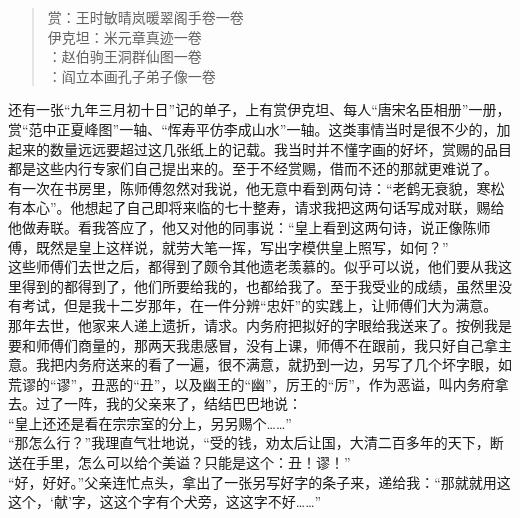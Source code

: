 \begin{quote}
	赏：王时敏晴岚暖翠阁手卷一卷\\

伊克坦：米元章真迹一卷\\

：赵伯驹王洞群仙图一卷\\

：阎立本画孔子弟子像一卷\\
\end{quote}

还有一张“九年三月初十日”记的单子，上有赏伊克坦、每人“唐宋名臣相册”一册，赏“范中正夏峰图”一轴、“恽寿平仿李成山水”一轴。这类事情当时是很不少的，加起来的数量远远要超过这几张纸上的记载。我当时并不懂字画的好坏，赏赐的品目都是这些内行专家们自己提出来的。至于不经赏赐，借而不还的那就更难说了。\\

有一次在书房里，陈师傅忽然对我说，他无意中看到两句诗：“老鹤无衰貌，寒松有本心”。他想起了自己即将来临的七十整寿，请求我把这两句话写成对联，赐给他做寿联。看我答应了，他又对他的同事说：“皇上看到这两句诗，说正像陈师傅，既然是皇上这样说，就劳大笔一挥，写出字模供皇上照写，如何？”\\

这些师傅们去世之后，都得到了颇令其他遗老羡慕的。似乎可以说，他们要从我这里得到的都得到了，他们所要给我的，也都给我了。至于我受业的成绩，虽然里没有考试，但是我十二岁那年，在一件分辨“忠奸”的实践上，让师傅们大为满意。\\

那年去世，他家来人递上遗折，请求。内务府把拟好的字眼给我送来了。按例我是要和师傅们商量的，那两天我患感冒，没有上课，师傅不在跟前，我只好自己拿主意。我把内务府送来的看了一遍，很不满意，就扔到一边，另写了几个坏字眼，如荒谬的“谬”，丑恶的“丑”，以及幽王的“幽”，厉王的“厉”，作为恶谥，叫内务府拿去。过了一阵，我的父亲来了，结结巴巴地说：\\

“皇上还还是看在宗宗室的分上，另另赐个……”\\

“那怎么行？”我理直气壮地说，“受的钱，劝太后让国，大清二百多年的天下，断送在手里，怎么可以给个美谥？只能是这个：丑！谬！”\\

“好，好好。”父亲连忙点头，拿出了一张另写好字的条子来，递给我：“那就就用这这个，‘献’字，这这个字有个犬旁，这这字不好……”\\

